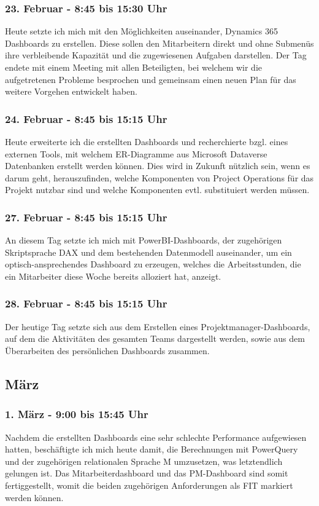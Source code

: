 \subsubsection*{23. Februar - 8:45 bis 15:30 Uhr}
Heute setzte ich mich mit den Möglichkeiten auseinander, Dynamics 365 Dashboards zu erstellen. Diese sollen den Mitarbeitern direkt und ohne Submenüs ihre verbleibende Kapazität und die zugewiesenen Aufgaben darstellen. Der Tag endete mit einem Meeting mit allen Beteiligten, bei welchem wir die aufgetretenen Probleme besprochen und gemeinsam einen neuen Plan für das weitere Vorgehen entwickelt haben.

\subsubsection*{24. Februar - 8:45 bis 15:15 Uhr}
Heute erweiterte ich die erstellten Dashboards und recherchierte bzgl. eines externen Tools, mit welchem ER-Diagramme aus Microsoft Dataverse Datenbanken erstellt werden können. Dies wird in Zukunft nützlich sein, wenn es darum geht, herauszufinden, welche Komponenten von Project Operations für das Projekt nutzbar sind und welche Komponenten evtl. substituiert werden müssen.

\subsubsection*{27. Februar - 8:45 bis 15:15 Uhr}
An diesem Tag setzte ich mich mit PowerBI-Dashboards, der zugehörigen Skriptsprache DAX und dem bestehenden Datenmodell auseinander, um ein optisch-ansprechendes Dashboard zu erzeugen, welches die  Arbeitsstunden, die ein Mitarbeiter diese Woche bereits alloziert hat, anzeigt.

\subsubsection*{28. Februar - 8:45 bis 15:15 Uhr}
Der heutige Tag setzte sich aus dem Erstellen eines Projektmanager-Dashboards, auf dem die Aktivitäten des gesamten Teams dargestellt werden, sowie aus dem Überarbeiten des persönlichen Dashboards zusammen.

\subsection{März}
\subsubsection*{1. März - 9:00 bis 15:45 Uhr}
Nachdem die erstellten Dashboards eine sehr schlechte Performance aufgewiesen hatten, beschäftigte ich mich heute damit, die Berechnungen mit PowerQuery und der zugehörigen relationalen Sprache M umzusetzen, was letztendlich gelungen ist. Das Mitarbeiterdashboard und das PM-Dashboard sind somit fertiggestellt, womit die beiden zugehörigen Anforderungen als FIT markiert werden können.

